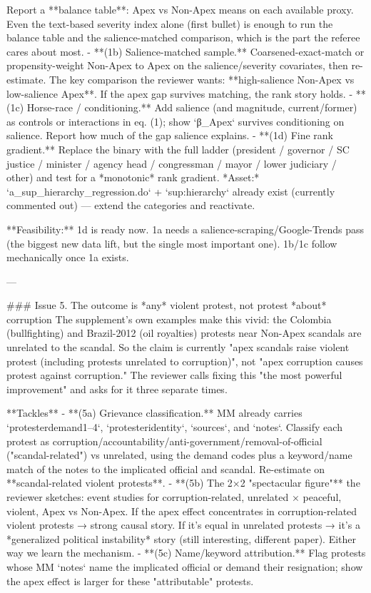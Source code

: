  Report a **balance table**: Apex vs Non-Apex means on each available proxy. Even
  the text-based severity index alone (first bullet) is enough to run the balance
  table and the salience-matched comparison, which is the part the referee cares
  about most.
- **(1b) Salience-matched sample.** Coarsened-exact-match or propensity-weight
  Non-Apex to Apex on the salience/severity covariates, then re-estimate. The
  key comparison the reviewer wants: **high-salience Non-Apex vs low-salience
  Apex**. If the apex gap survives matching, the rank story holds.
- **(1c) Horse-race / conditioning.** Add salience (and magnitude, current/former)
  as controls or interactions in eq. (1); show `β_Apex` survives conditioning on
  salience. Report how much of the gap salience explains.
- **(1d) Fine rank gradient.** Replace the binary with the full ladder
  (president / governor / SC justice / minister / agency head / congressman /
  mayor / lower judiciary / other) and test for a *monotonic* rank gradient.
  *Asset:* `a_sup_hierarchy_regression.do` + `sup:hierarchy` already exist
  (currently commented out) — extend the categories and reactivate.

**Feasibility:** 1d is ready now. 1a needs a salience-scraping/Google-Trends
pass (the biggest new data lift, but the single most important one). 1b/1c
follow mechanically once 1a exists.

---

### Issue 5. The outcome is *any* violent protest, not protest *about* corruption
The supplement's own examples make this vivid: the Colombia (bullfighting) and
Brazil-2012 (oil royalties) protests near Non-Apex scandals are unrelated to the
scandal. So the claim is currently "apex scandals raise violent protest
(including protests unrelated to corruption)", not "apex corruption causes
protest against corruption." The reviewer calls fixing this "the most powerful
improvement" and asks for it three separate times.

**Tackles**
- **(5a) Grievance classification.** MM already carries `protesterdemand1–4`,
  `protesteridentity`, `sources`, and `notes`. Classify each protest as
  corruption/accountability/anti-government/removal-of-official ("scandal-related")
  vs unrelated, using the demand codes plus a keyword/name match of the notes to
  the implicated official and scandal. Re-estimate on **scandal-related violent
  protests**.
- **(5b) The 2×2 "spectacular figure"** the reviewer sketches: event studies for
  {corruption-related, unrelated} × {peaceful, violent}, Apex vs Non-Apex. If the
  apex effect concentrates in corruption-related violent protests → strong causal
  story. If it's equal in unrelated protests → it's a *generalized political
  instability* story (still interesting, different paper). Either way we learn the
  mechanism.
- **(5c) Name/keyword attribution.** Flag protests whose MM `notes` name the
  implicated official or demand their resignation; show the apex effect is larger
  for these "attributable" protests.

